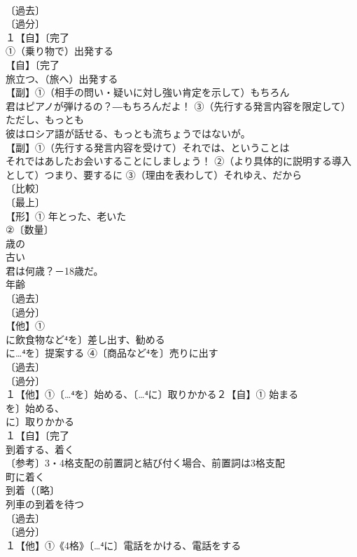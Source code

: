 \documentclass[8pt]{extreport}
\begin{document}
\begin{CJK}{UTF8}{min}
\\	〔過去〕
\\	〔過分〕
\\	１【自】〔完了
\\	①（乗り物で）出発する 
\\	【自】〔完了
\\	旅立つ、（旅へ）出発する
\\	【副】①（相手の問い・疑いに対し強い肯定を示して）もちろん 
\\	君はピアノが弾けるの？―もちろんだよ！ ③（先行する発言内容を限定して）ただし、もっとも 
\\	彼はロシア語が話せる、もっとも流ちょうではないが。
\\	【副】①（先行する発言内容を受けて）それでは、ということは 
\\	それではあしたお会いすることにしましょう！ ②（より具体的に説明する導入として）つまり、要するに ③（理由を表わして）それゆえ、だから
\\	〔比較〕
\\	〔最上〕
\\	【形】① 年とった、老いた
\\	②〔数量〕
\\	歳の　
\\	古い
\\	君は何歳？－18歳だ。 
\\	年齢
\\	〔過去〕
\\	〔過分〕
\\	【他】①
\\	に飲食物など⁴を〕差し出す、勧める 
\\	に…⁴を〕提案する ④〔商品など⁴を〕売りに出す 
\\	〔過去〕
\\	〔過分〕
\\	１【他】①〔…⁴を〕始める、〔…⁴に〕取りかかる２【自】① 始まる
\\	を〕始める、
\\	に〕取りかかる
\\	１【自】〔完了
\\	到着する、着く
\\	〔参考〕3・4格支配の前置詞と結び付く場合、前置詞は3格支配 
\\	町に着く
\\	到着（〔略〕
\\	列車の到着を待つ
\\	〔過去〕
\\	〔過分〕
\\	１【他】①《4格》〔…⁴に〕電話をかける、電話をする

\end{CJK}
\end{document}
